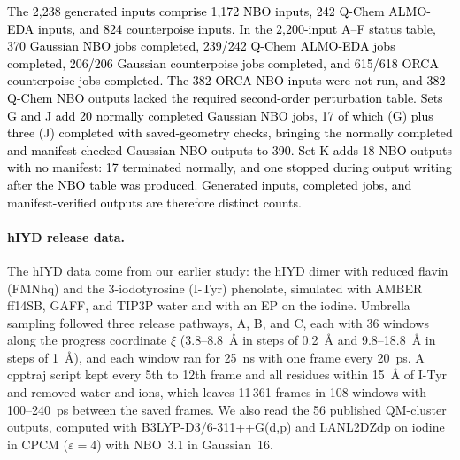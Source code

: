\documentclass[journal=jcisd8,manuscript=article,layout=two-column]{achemso}
\newcommand{\tcb}[1]{{\textcolor{black}{#1}}}
\begin{document}
\tcb{The 2,238 generated inputs comprise 1,172 NBO inputs, 242 Q-Chem ALMO-EDA inputs, and 824 counterpoise inputs. In the 2,200-input A--F status table, 370 Gaussian NBO jobs completed, 239/242 Q-Chem ALMO-EDA jobs completed, 206/206 Gaussian counterpoise jobs completed, and 615/618 ORCA counterpoise jobs completed. The 382 ORCA NBO inputs were not run, and 382 Q-Chem NBO outputs lacked the required second-order perturbation table. Sets G and J add 20 normally completed Gaussian NBO jobs, 17 of which (G) plus three (J) completed with saved-geometry checks, bringing the normally completed and manifest-checked Gaussian NBO outputs to 390. Set K adds 18 NBO outputs with no manifest: 17 terminated normally, and one stopped during output writing after the NBO table was produced. Generated inputs, completed jobs, and manifest-verified outputs are therefore distinct counts.}


\paragraph{hIYD release data.}
The hIYD data come from our earlier study:\cite{Karmakar2026} the hIYD dimer with reduced flavin (FMNhq) and the 3-iodotyrosine (I-Tyr) phenolate, simulated with AMBER ff14SB, GAFF,\cite{Wang2004GAFF} and TIP3P water and with an EP on the iodine. Umbrella sampling followed three release pathways, A, B, and C, each with 36 windows along the progress coordinate $\xi$ (3.8--\SI{8.8}{\angstrom} in steps of \SI{0.2}{\angstrom} and 9.8--\SI{18.8}{\angstrom} in steps of \SI{1}{\angstrom}), and each window ran for 25~ns with one frame every 20~ps. A cpptraj\cite{RoeCheatham2013} script kept every 5th to 12th frame and all residues within \SI{15}{\angstrom} of I-Tyr and removed water and ions, which leaves 11\,361 frames in 108 windows with 100--240~ps between the saved frames. We also read the 56 published QM-cluster outputs, computed with B3LYP-D3/6-311++G(d,p) and LANL2DZdp on iodine\cite{Check2001} in CPCM ($\varepsilon=4$) with NBO~3.1 in Gaussian~16.
\end{document}
